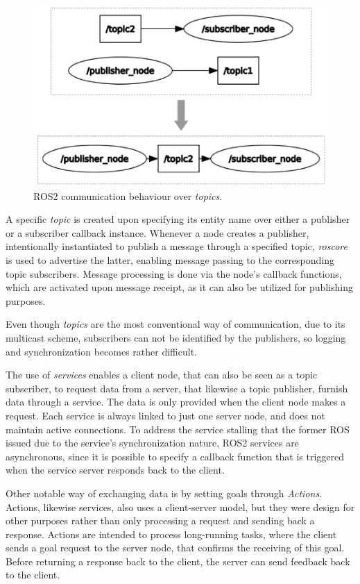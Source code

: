 \begin{figure}[H]
    \centering
    \includegraphics[width=0.4\linewidth]{images/ros2-topics.png}
    \caption{ROS2 communication behaviour over \textit{topics}.}
    \label{fig:ros2-topics}
\end{figure}

A specific \textit{topic} is created upon specifying its entity name over either a publisher or a subscriber callback instance. Whenever a node creates a publisher, intentionally instantiated to publish a message through a specified topic, \textit{roscore} is used to advertise the latter, enabling message passing to the corresponding topic subscribers. Message processing is done via the node's callback functions, which are activated upon message receipt, as it can also be utilized for publishing purposes. \cite{casini2019response}

Even though \textit{topics} are the most conventional way of communication, due to its multicast scheme, subscribers can not be identified by the publishers, so logging and synchronization becomes rather difficult. \cite{intro-ros}

The use of \textit{services} enables a client node, that can also be seen as a topic subscriber, to request data from a server, that likewise a topic publisher, furnish data through a service. The data is only provided when the client node makes a request. Each service is always linked to just one server node, and does not maintain active connections. To address the service stalling that the former ROS issued due to the service's synchronization nature, ROS2 services are asynchronous, since it is possible to specify a callback function that is triggered when the service server responds back to the client.

Other notable way of exchanging data is by setting goals through \textit{Actions}. Actions, likewise services, also uses a client-server model, but they were design for other purposes rather than only processing a request and sending back a response. Actions are intended to process long-running tasks, where the client sends a goal request to the server node, that confirms the receiving of this goal. Before returning a response back to the client, the server can send feedback back to the client. 

